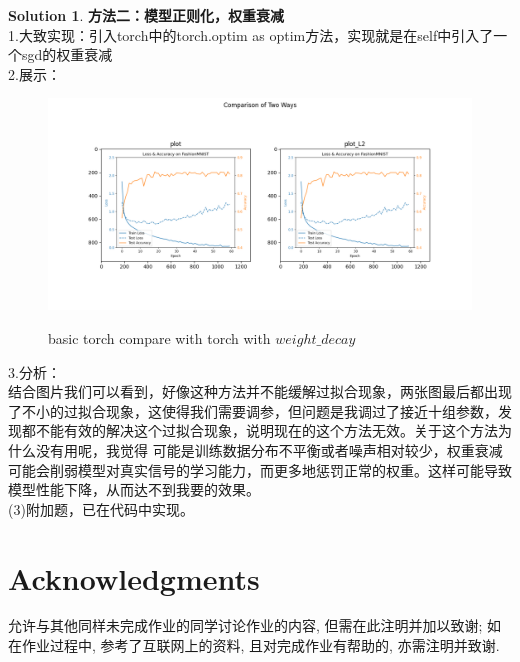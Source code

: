 \documentclass[a4paper,UTF8]{article}
\numberwithin{equation}{section}
\theoremstyle{definition}
\newtheorem*{solution}{Solution}
\begin{document}
\begin{solution}
\textbf{方法二：模型正则化，权重衰减}\\
1.大致实现：引入torch中的torch.optim as optim方法，实现就是在self中引入了一个sgd的权重衰减\\
2.展示：
\begin{figure}[H]
    \centering
    \includegraphics[width=1.1\textwidth]{compare1.png}\\
    \caption{basic torch compare with torch with $weight\_decay$}
    \label{fig:basic torch compare with torch with weight_decay}
\end{figure} 
3.分析：\\
结合图片我们可以看到，好像这种方法并不能缓解过拟合现象，两张图最后都出现了不小的过拟合现象，这使得我们需要调参，但问题是我调过了接近十组参数，发现都不能有效的解决这个过拟合现象，说明现在的这个方法无效。关于这个方法为什么没有用呢，我觉得
可能是训练数据分布不平衡或者噪声相对较少，权重衰减可能会削弱模型对真实信号的学习能力，而更多地惩罚正常的权重。这样可能导致模型性能下降，从而达不到我要的效果。\\

(3)附加题，已在代码中实现。



\end{solution}

\newpage

\section*{Acknowledgments}
允许与其他同样未完成作业的同学讨论作业的内容, 但需在此注明并加以致谢; 如在作业过程中, 参考了互联网上的资料, 且对完成作业有帮助的, 亦需注明并致谢.
\end{document}
